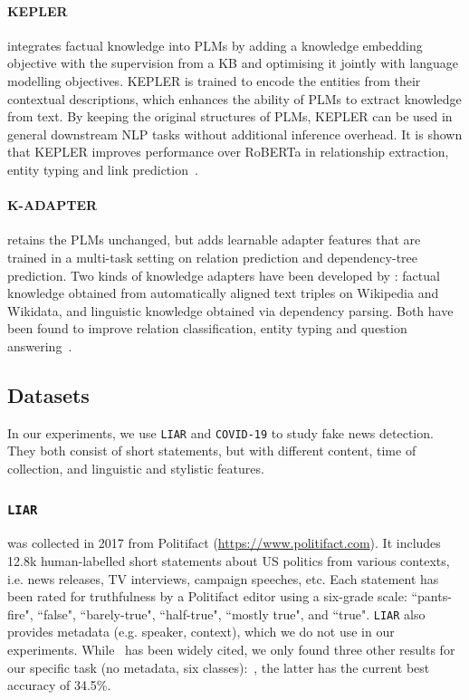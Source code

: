 \documentclass[letterpaper]{article} %
\begin{document}
\paragraph{KEPLER} integrates factual knowledge into PLMs by adding a knowledge embedding objective with the supervision from a KB and optimising it jointly with language modelling objectives.
KEPLER is trained to encode the entities from their contextual descriptions, which enhances the ability of PLMs to extract knowledge from text.
By keeping the original structures of PLMs, KEPLER can be used in general downstream NLP tasks without additional inference overhead.
It is shown that KEPLER improves performance over RoBERTa \cite{Liu2019RoBERTaAR} in relationship extraction, entity typing and link prediction~\cite{kepler}.

\paragraph{K-ADAPTER} retains the PLMs unchanged,
but adds learnable adapter features that are trained in a multi-task setting on relation prediction and dependency-tree prediction.
Two kinds of knowledge adapters have been developed by \citet{wang-etal-2021-k}: factual knowledge obtained from automatically aligned text triples on Wikipedia and Wikidata, and linguistic knowledge obtained via dependency parsing.
Both have been found to improve relation classification, entity typing and question answering~\cite{wang-etal-2021-k}.

\subsection{Datasets}
In our experiments, we use \texttt{LIAR} and \texttt{COVID-19} to study fake news detection.
They both consist of short statements, but with different content, time of collection, and linguistic and stylistic features.



\subsubsection{\texttt{LIAR}} was collected in 2017 from Politifact (\url{https://www.politifact.com}).
It includes 12.8k human-labelled short statements about US politics from various contexts, i.e. news releases, TV interviews, campaign speeches, etc.
Each statement has been rated for truthfulness by a Politifact editor using a six-grade scale: ``pants-fire", ``false", ``barely-true", ``half-true", ``mostly true", and ``true".
\texttt{LIAR} also provides metadata (e.g. speaker, context),
which we do not use in our experiments.
While~\citet{wang-2017-liar} has been widely cited,
we only found three other results for our specific task (no metadata, six classes):~\cite{alhindi-etal-2018-evidence, Liu2019ATM, Chernyavskiy2020RecursiveNT}, the latter has the current best accuracy of 34.5\%.
\end{document}

